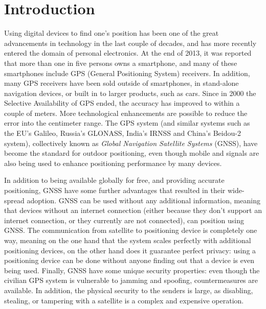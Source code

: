 \chapter{Introduction}

Using digital devices to find one's position has been one of the great advancements in technology in the last couple of decades, and has more recently entered the domain of personal electronics.
At the end of 2013, it was reported that more than one in five persons owns a smartphone, and many of these smartphones include GPS (General Positioning System) receivers.
In addition, many GPS receivers have been sold outside of smartphones, in stand-alone navigation devices, or built in to larger products, such as cars.
Since in 2000 the Selective Availability of GPS ended, the accuracy has improved to within a couple of meters.
More technological enhancements are possible to reduce the error into the centimeter range.
The GPS system (and similar systems such as the EU's Galileo, Russia's GLONASS, India's IRNSS and China's Beidou-2 system), collectively known as \emph{Global Navigation Satellite Systems} (GNSS), have become the standard for outdoor positioning, even though mobile and \wifi signals are also being used to enhance positioning performance by many devices.

In addition to being available globally for free, and providing accurate positioning, GNSS have some further advantages that resulted in their wide-spread adoption.
GNSS can be used without any additional information, meaning that devices without an internet connection (either because they don't support an internet connection, or they currently are not connected), can position using GNSS.
The communication from satellite to positioning device is completely one way, meaning on the one hand that the system scales perfectly with additional positioning devices, on the other hand does it guarantee perfect privacy: using a positioning device can be done without anyone finding out that a device is even being used.
Finally, GNSS have some unique security properties: even though the civilian GPS system is vulnerable to jamming and spoofing\citep{volpe2001vulnerability,grant2009gps}, countermeasures are available\citep{warner2003gps,lo2009signal}.
In addition, the physical security to the senders is large, as disabling, stealing, or tampering with a satellite is a complex and expensive operation.

